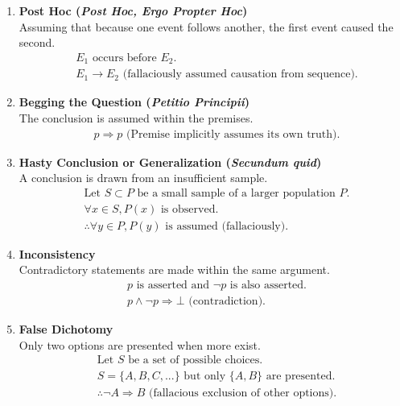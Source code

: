 \begin{enumerate}
    \item \textbf{Post Hoc (\textit{Post Hoc, Ergo Propter Hoc})}  \\
    Assuming that because one event follows another, the first event caused the second.
    \begin{align*}
        &E_1 \text{ occurs before } E_2. \\
        &E_1 \rightarrow E_2 \text{ (fallaciously assumed causation from sequence).}
    \end{align*}

    \item \textbf{Begging the Question (\textit{Petitio Principii})}  \\
    The conclusion is assumed within the premises.
    \begin{align*}
        &p \Rightarrow p \text{ (Premise implicitly assumes its own truth).}
    \end{align*}

    \item \textbf{Hasty Conclusion or Generalization (\textit{Secundum quid})}  \\
    A conclusion is drawn from an insufficient sample.
    \begin{align*}
        &\text{Let } S \subset P \text{ be a small sample of a larger population } P. \\
        &\forall x \in S, P(x) \text{ is observed.} \\
        &\therefore \forall y \in P, P(y) \text{ is assumed (fallaciously).}
    \end{align*}

    \item \textbf{Inconsistency}  \\
    Contradictory statements are made within the same argument.
    \begin{align*}
        &p \text{ is asserted and } \neg p \text{ is also asserted.} \\
        &p \wedge \neg p \Rightarrow \bot \text{ (contradiction).}
    \end{align*}

    \item \textbf{False Dichotomy}  \\
    Only two options are presented when more exist.
    \begin{align*}
        &\text{Let } S \text{ be a set of possible choices.} \\
        &S = \{A, B, C, ...\} \text{ but only } \{A, B\} \text{ are presented.} \\
        &\therefore \neg A \Rightarrow B \text{ (fallacious exclusion of other options).}
    \end{align*}


\end{enumerate}
